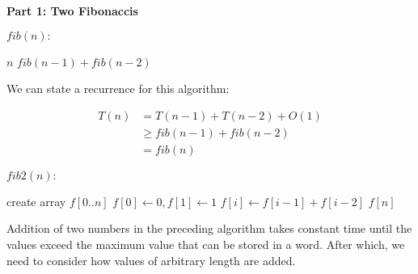 {\bf Part 1: Two Fibonaccis}

$fib(n):$
\begin{algorithmic}
\RETURN $n$
\ELSE
\RETURN $fib(n-1) + fib(n-2)$
\ENDIF
\end{algorithmic}

We can state a recurrence for this algorithm:

\begin{align*}
T(n) 
&= T(n-1) + T(n-2) + O(1) \\
&\geq fib(n-1) + fib(n-2) \\
&= fib(n)
\end{align*}

$fib2(n):$
\begin{algorithmic}
\ENDIF
\STATE create array $f[0 .. n]$
\STATE $f[0] \leftarrow 0, f[1] \leftarrow 1$
\STATE $f[i] \leftarrow f[i-1] + f[i-2]$
\ENDFOR
\RETURN $f[n]$
\end{algorithmic}

Addition of two numbers in the preceding algorithm takes constant time
until the values exceed the maximum value that can be stored in a
word.  After which, we need to consider how values of arbitrary length
are added.
